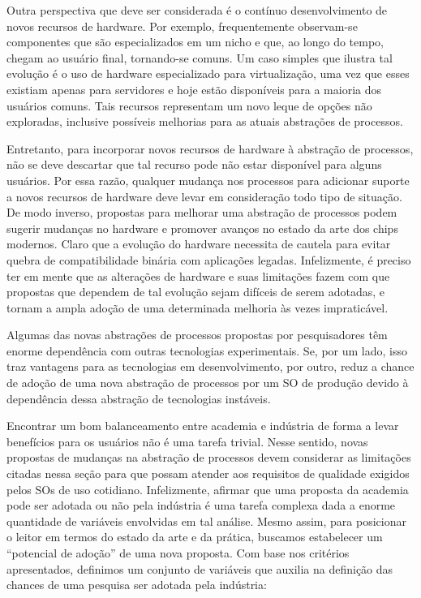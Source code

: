 Outra perspectiva que deve ser considerada é o contínuo desenvolvimento de novos
recursos de hardware. Por exemplo, frequentemente observam-se componentes que
são especializados em um nicho e que, ao longo do tempo, chegam ao usuário
final, tornando-se comuns. Um caso simples que ilustra tal evolução é o
uso de hardware especializado para virtualização, uma vez que esses existiam
apenas para servidores e hoje estão disponíveis para a maioria dos usuários
comuns. Tais recursos representam um novo leque de opções não exploradas,
inclusive possíveis melhorias para as atuais abstrações de processos.

Entretanto, para incorporar novos recursos de hardware à abstração de processos,
não se deve descartar que tal recurso pode não estar disponível para alguns
usuários. Por essa razão, qualquer mudança nos processos para adicionar suporte
a novos recursos de hardware deve levar em consideração todo tipo de situação.
De modo inverso, propostas para melhorar uma abstração de processos podem
sugerir mudanças no hardware e promover avanços no estado da arte dos chips
modernos. Claro que a evolução do hardware necessita de cautela para evitar
quebra de compatibilidade binária com aplicações legadas. Infelizmente, é
preciso ter em mente que as alterações de hardware e suas limitações fazem com
que propostas que dependem de tal evolução sejam difíceis de serem adotadas, e
tornam a ampla adoção de uma determinada melhoria às vezes impraticável.

Algumas das novas abstrações de processos propostas por pesquisadores têm
enorme dependência com outras tecnologias experimentais. Se, por um lado, isso
traz vantagens para as tecnologias em desenvolvimento, por outro, reduz a chance
de adoção de uma nova abstração de processos por um SO de produção devido à
dependência dessa abstração de tecnologias instáveis.

Encontrar um bom balanceamento entre academia e indústria de forma a levar
benefícios para os usuários não é uma tarefa trivial. Nesse sentido, novas
propostas de mudanças na abstração de processos devem considerar as limitações
citadas nessa seção para que possam atender aos requisitos de qualidade
exigidos pelos SOs de uso cotidiano. Infelizmente, afirmar que uma proposta da
academia pode ser adotada ou não pela indústria é uma tarefa complexa dada a
enorme quantidade de variáveis envolvidas em tal análise. Mesmo assim, para
posicionar o leitor em termos do estado da arte e da prática, buscamos
estabelecer um ``potencial de adoção'' de uma nova proposta. Com base nos
critérios apresentados, definimos um conjunto de variáveis que auxilia
na definição das chances de uma pesquisa ser adotada pela indústria:

